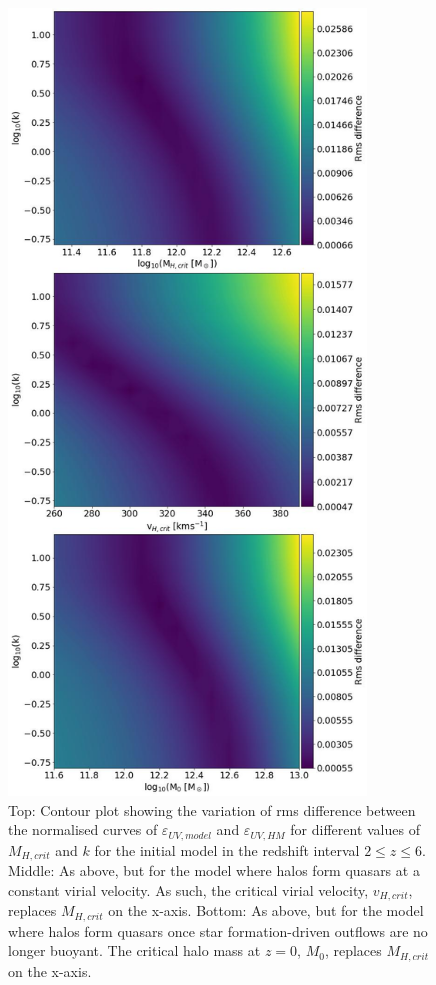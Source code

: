 \documentclass[12pt]{article}%
\begin{document}
\begin{figure}[H]
\centering
\includegraphics[width=9.5cm]{Plot_11.jpeg}
\caption{Top: Contour plot showing the variation of rms difference between the normalised curves of $\varepsilon_{UV,model}$ and $\varepsilon_{UV,HM}$ for different values of $M_{H,crit}$ and $k$ for the initial model in the redshift interval $2\leq z\leq6$. Middle: As above, but for the model where halos form quasars at a constant virial velocity. As such, the critical virial velocity, $v_{H,crit}$, replaces $M_{H,crit}$ on the x-axis. Bottom: As above, but for the model where halos form quasars once star formation-driven outflows are no longer buoyant. The critical halo mass at $z=0$, $M_0$, replaces $M_{H,crit}$ on the x-axis.}
\label{fig:12}
\end{figure}
\clearpage
\twocolumngrid
\end{document}
